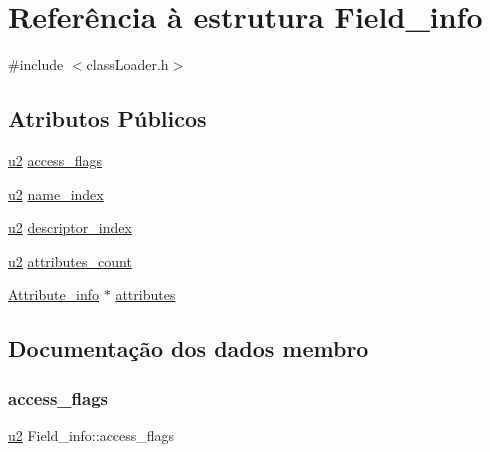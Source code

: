 \hypertarget{struct_field__info}{}\section{Referência à estrutura Field\+\_\+info}
\label{struct_field__info}


{\ttfamily \#include $<$class\+Loader.\+h$>$}

\subsection*{Atributos Públicos}
\begin{DoxyCompactItemize}
\item 
\hyperlink{util_8h_a55ef8d87fd202b8417704c089899c5b9}{u2} \hyperlink{struct_field__info_aa23532a5577624b81550ffff8801ef4f}{access\+\_\+flags}
\item 
\hyperlink{util_8h_a55ef8d87fd202b8417704c089899c5b9}{u2} \hyperlink{struct_field__info_ab08cf316ad4af84d9a6dfd12bbbdc0fc}{name\+\_\+index}
\item 
\hyperlink{util_8h_a55ef8d87fd202b8417704c089899c5b9}{u2} \hyperlink{struct_field__info_a6513dda6705b584d2da444ee32ea5283}{descriptor\+\_\+index}
\item 
\hyperlink{util_8h_a55ef8d87fd202b8417704c089899c5b9}{u2} \hyperlink{struct_field__info_a4f9e6178d09bb7ce6e32d26e5247bc55}{attributes\+\_\+count}
\item 
\hyperlink{struct_attribute__info}{Attribute\+\_\+info} $\ast$ \hyperlink{struct_field__info_a82d5d1b1ba57dfc6b711072777d92894}{attributes}
\end{DoxyCompactItemize}


\subsection{Documentação dos dados membro}
\mbox{\label{struct_field__info_aa23532a5577624b81550ffff8801ef4f}} 
\subsubsection{\texorpdfstring{access\+\_\+flags}{access\_flags}}
{\footnotesize\ttfamily \hyperlink{util_8h_a55ef8d87fd202b8417704c089899c5b9}{u2} Field\+\_\+info\+::access\+\_\+flags}

